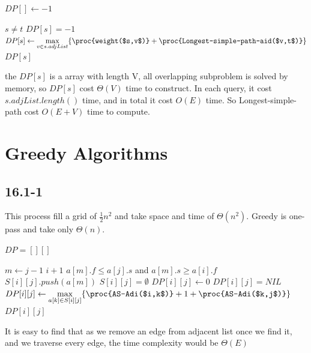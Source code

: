 \documentclass[]{article}
\begin{document}
\begin{codebox}
	\li $DP[] \leftarrow -1$
	\li \Return {}
\end{codebox}

\begin{codebox}
	\li \If $s \neq t$
	\li \Then \If $DP[s] = -1$
	\li \Then $DP[s] \leftarrow \underset {v \in s.adjList}{\max} \{ \proc{weight($s,v$)}+\proc{Longest-simple-path-aid($v,t$)}\} $
	\End
	\li \Return $DP[s]$
	\li \Else {}
	\End
\end{codebox}

the $DP[s]$ is a array with length V, all overlapping subproblem is solved by memory, so $DP[s]$ cost $\Theta(V)$ time to construct. In each query, it cost $s.adjList.length()$ time, and in total it cost $O(E)$ time. So Longest-simple-path cost $O(E+V)$ time to compute.


\section{Greedy Algorithms}
\subsection{16.1-1}

This process fill a grid of $\frac{1}{2}n^2$ and take space and time of $\Theta(n^2)$. Greedy is one-pass and take only $\Theta(n)$.

\begin{codebox}
	\li $DP = [][]$
	\li \Return {}
\end{codebox}

\begin{codebox}
	\li \For $m \leftarrow j-1$ \Downto $i+1$
	\li \Do \If $a[m].f \le a[j].s$ and $a[m].s \ge a[i].f$
	\li \Then $S[i][j].push(a[m])$ \End \End
	\li \If $S[i][j] = \emptyset$ 
	\li \Then $DP[i][j] \leftarrow 0$
	\li \Else 
	\li \If $DP[i][j] = NIL$
	\li \Then $DP[i][j] \leftarrow \underset{a[k] \in S[i][j]}{\max} \{\proc{AS-Adi($i,k$)} + 1 + \proc{AS-Adi($k,j$)} \} $ \End \End
	\li \Return $DP[i][j]$
	
\end{codebox}

It is easy to find that as we remove an edge from adjacent list once we find it, and we traverse every edge, the time complexity would be $\Theta(E)$
\end{document}
